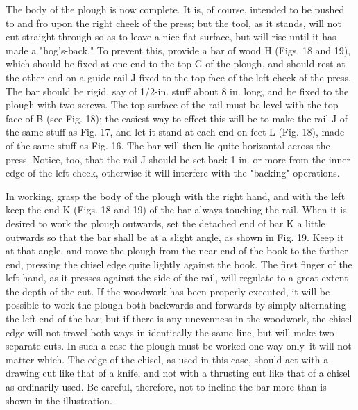 \documentclass[twoside]{book}
\begin{document}
The body of the plough is now complete. It is,
\pagebreak
of course, intended to be pushed to and fro upon
the right cheek of the press; but the tool, as it
stands, will not cut straight through so as to leave
a nice flat surface, but will rise until it has made
a "hog's-back."  To prevent this, provide a bar of
wood H (Figs. 18 and 19), which should be fixed at
one end to the top G of the plough, and should rest
at the other end on a guide-rail J fixed to the top
face of the left cheek of the press. The bar should
be rigid, say of 1/2-in. stuff about 8 in. long, and be
fixed to the plough with two screws. The top surface
of the rail must be level with the top face of B
(see Fig. 18); the easiest way to effect this will be
to make the rail J of the same stuff as Fig. 17, and
let it stand at each end on feet L (Fig. 18), made of
the same stuff as Fig. 16. The bar will then lie
quite horizontal across the press. Notice, too, that
the rail J should be set back 1 in. or more from the
inner edge of the left cheek, otherwise it will
interfere with the "backing" operations.

In working, grasp the body of the plough with
the right hand, and with the left keep the end K
(Figs. 18 and 19) of the bar always touching the
rail. When it is desired to work the plough outwards,
set the detached end of bar K a little outwards
so that the bar shall be at a slight angle, as
shown in Fig. 19. Keep it at that angle, and move
the plough from the near end of the book to the
farther end, pressing the chisel edge quite lightly
against the book. The first finger of the left hand,
as it presses against the side of the rail, will
regulate to a great extent the depth of the cut. If the
woodwork has been properly executed, it will be
possible to work the plough both backwards and forwards
by simply alternating the left end of the bar;
but if there is any unevenness in the woodwork, the
chisel edge will not travel both ways in identically
the same line, but will make two separate cuts. In
such a case the plough must be worked one way
\pagebreak
only--it will not matter which. The edge of the
chisel, as used in this case, should act with a drawing
cut like that of a knife, and not with a thrusting
cut like that of a chisel as ordinarily used. Be
careful, therefore, not to incline the bar more than is
shown in the illustration.
\end{document}
